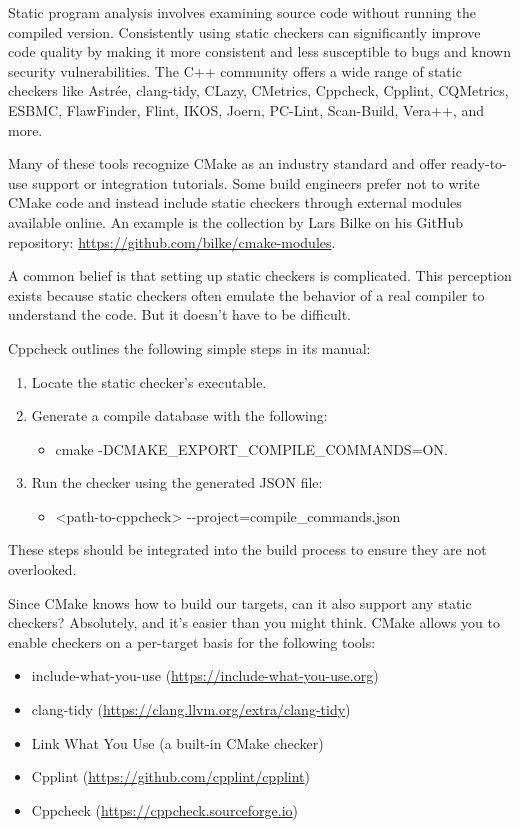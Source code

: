 
Static program analysis involves examining source code without running the compiled version. Consistently using static checkers can significantly improve code quality by making it more consistent and less susceptible to bugs and known security vulnerabilities. The C++ community offers a wide range of static checkers like Astrée, clang-tidy, CLazy, CMetrics, Cppcheck, Cpplint, CQMetrics, ESBMC, FlawFinder, Flint, IKOS, Joern, PC-Lint, Scan-Build, Vera++, and more.

Many of these tools recognize CMake as an industry standard and offer ready-to-use support or integration tutorials. Some build engineers prefer not to write CMake code and instead include static checkers through external modules available online. An example is the collection by Lars Bilke on his GitHub repository: \url{https://github.com/bilke/cmake-modules}.

A common belief is that setting up static checkers is complicated. This perception exists because static checkers often emulate the behavior of a real compiler to understand the code. But it doesn’t have to be difficult.

Cppcheck outlines the following simple steps in its manual:

\begin{enumerate}
\item
Locate the static checker’s executable.

\item
Generate a compile database with the following:
\begin{itemize}
\item
cmake -DCMAKE\_EXPORT\_COMPILE\_COMMANDS=ON.
\end{itemize}

\item
Run the checker using the generated JSON file:
\begin{itemize}
\item
<path-to-cppcheck> -{}-project=compile\_commands.json
\end{itemize}
\end{enumerate}

These steps should be integrated into the build process to ensure they are not overlooked.

Since CMake knows how to build our targets, can it also support any static checkers? Absolutely, and it’s easier than you might think. CMake allows you to enable checkers on a per-target basis for the following tools:

\begin{itemize}
\item
include-what-you-use (\url{https://include-what-you-use.org})

\item
clang-tidy (\url{https://clang.llvm.org/extra/clang-tidy})

\item
Link What You Use (a built-in CMake checker)

\item
Cpplint (\url{https://github.com/cpplint/cpplint})

\item
Cppcheck (\url{https://cppcheck.sourceforge.io})
\end{itemize}

